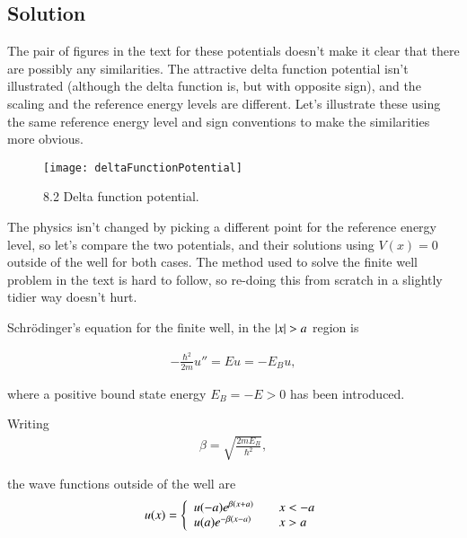 \subsection{Solution}

The pair of figures in the text \cite{desai2009quantum} for these potentials doesn't make it clear that there are possibly any similarities.  The attractive delta function potential isn't illustrated (although the delta function is, but with opposite sign), and the scaling and the reference energy levels are different.  Let's illustrate these using the same reference energy level and sign conventions to make the similarities more obvious.


\begin{figure}[htp]
\centering
\texttt{[image: deltaFunctionPotential]}
\caption{8.2 Delta function potential.}\label{fig:deltaFunctionPotential}
\end{figure}

The physics isn't changed by picking a different point for the reference energy level, so let's compare the two potentials, and their solutions using $V(x) = 0$ outside of the well for both cases.  The method used to solve the finite well problem in the text is hard to follow, so re-doing this from scratch in a slightly tidier way doesn't hurt.

Schr\"{o}dinger's equation for the finite well, in the $\left\lvert{x}\right\rvert > a$ region is

\begin{align}\label{eqn:qmIproblemSet4:110}
-\frac{\hbar^2}{2m} u'' = E u = - E_B u,
\end{align}

where a positive bound state energy $E_B = -E > 0$ has been introduced.

Writing 
\begin{align}\label{eqn:qmIproblemSet4:115}
\beta = \sqrt{\frac{2 m E_B}{\hbar^2}},
\end{align}

the wave functions outside of the well are 
\begin{align}\label{eqn:qmIproblemSet4:120}
u(x) =
\left\{
\begin{array}{l l}
u(-a) e^{\beta(x+a)} &\quad \mbox{$x < -a$} \\
u(a) e^{-\beta(x-a)} &\quad \mbox{$x > a$} \\
\end{array}
\right.
\end{align}

